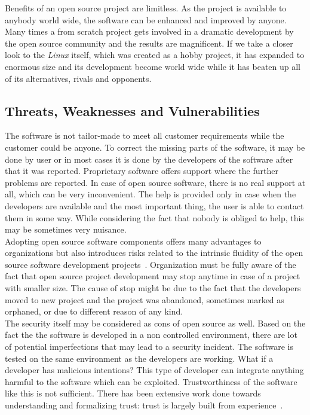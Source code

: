 \documentclass[12pt,a4paper]{article}
\theoremstyle{definition}
\begin{document}
        Benefits of an open source project are limitless. As the project is available to anybody world wide, the software can be enhanced and improved by anyone. Many times a from scratch project gets involved in a dramatic development by the open source community and the results are magnificent. If we take a closer look to the \textit{Linux} itself, which was created as a hobby project, it has expanded to enormous size and its development become world wide while it has beaten up all of its alternatives, rivals and opponents.

    \subsection{Threats, Weaknesses and Vulnerabilities}

        The software is not tailor-made to meet all customer requirements while the customer could be anyone. To correct the missing parts of the software, it may be done by user or in most cases it is done by the developers of the software after that it was reported. Proprietary software offers support where the further problems are reported. In case of open source software, there is no real support at all, which can be very inconvenient. The help is provided only in case when the developers are available and the most important thing, the user is able to contact them in some way. While considering the fact that nobody is obliged to help, this may be sometimes very nuisance.\\

        Adopting open source software components offers many advantages to organizations but also introduces risks related to the intrinsic fluidity of the open source software development projects~\cite{7883433}. Organization must be fully aware of the fact that open source project development may stop anytime in case of a project with smaller size. The cause of stop might be due to the fact that the developers moved to new project and the project was abandoned, sometimes marked as orphaned, or due to different reason of any kind.\\

        The security itself may be considered as cons of open source as well. Based on the fact the the software is developed in a non controlled environment, there are lot of potential imperfections that may lead to a security incident. The software is tested on the same environment as the developers are working. What if a developer has malicious intentions? This type of developer can integrate anything harmful to the software which can be exploited. Trustworthiness of the software like this is not sufficient. There has been extensive work done towards understanding and formalizing trust: trust is largely built from experience~\cite{6340126}.
\end{document}
